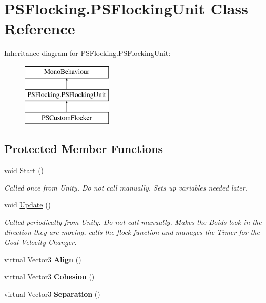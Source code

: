 \hypertarget{class_p_s_flocking_1_1_p_s_flocking_unit}{}\section{P\+S\+Flocking.\+P\+S\+Flocking\+Unit Class Reference}
\label{class_p_s_flocking_1_1_p_s_flocking_unit}
Inheritance diagram for P\+S\+Flocking.\+P\+S\+Flocking\+Unit\+:\begin{figure}[H]
\begin{center}
\leavevmode
\includegraphics[height=3.000000cm]{class_p_s_flocking_1_1_p_s_flocking_unit}
\end{center}
\end{figure}
\subsection*{Protected Member Functions}
\begin{DoxyCompactItemize}
\item 
\mbox{\label{class_p_s_flocking_1_1_p_s_flocking_unit_ac839f13af6962f86198dd14bf8e2495b}} 
void \hyperlink{class_p_s_flocking_1_1_p_s_flocking_unit_ac839f13af6962f86198dd14bf8e2495b}{Start} ()
\begin{DoxyCompactList}\small\item\em Called once from Unity. Do not call manually. Sets up variables needed later. \end{DoxyCompactList}\item 
void \hyperlink{class_p_s_flocking_1_1_p_s_flocking_unit_a4bfe16a5cf81ba127fc76597cb86623a}{Update} ()
\begin{DoxyCompactList}\small\item\em Called periodically from Unity. Do not call manually. Makes the Boids look in the direction they are moving, calls the flock function and manages the Timer for the Goal-\/\+Velocity-\/\+Changer. \end{DoxyCompactList}\item 
\mbox{\label{class_p_s_flocking_1_1_p_s_flocking_unit_ada3fa9e23f12a1b8258dc324f5b3e511}} 
virtual Vector3 {\bfseries Align} ()
\item 
\mbox{\label{class_p_s_flocking_1_1_p_s_flocking_unit_a87ad210603e8d8451e14a4de8af9cba0}} 
virtual Vector3 {\bfseries Cohesion} ()
\item 
\mbox{\label{class_p_s_flocking_1_1_p_s_flocking_unit_af486901d480a5520aeae135d46635e60}} 
virtual Vector3 {\bfseries Separation} ()
\end{DoxyCompactItemize}
